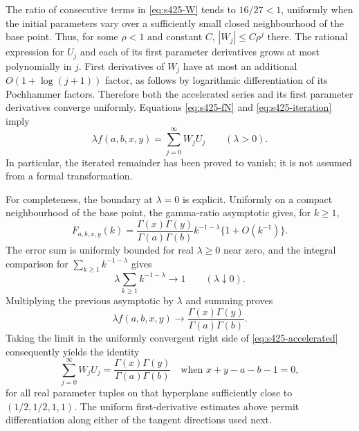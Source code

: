 \documentclass[11pt,a4paper]{article}
\theoremstyle{remark}\newtheorem{remark}[theorem]{Remark}
\numberwithin{equation}{section}
\begin{document}
The ratio of consecutive terms in \eqref{eq:s425-W} tends to
$16/27<1$, uniformly when the initial parameters vary over a sufficiently
small closed neighbourhood of the base point. Thus, for some $\rho<1$
and constant $C$, $|W_j|\le C\rho^j$ there. The rational expression for
$U_j$ and each of its first parameter derivatives grows at most
polynomially in $j$. First derivatives of $W_j$ have at most an
additional $O(1+\log(j+1))$ factor, as follows by logarithmic
differentiation of its Pochhammer factors. Therefore both the accelerated
series and its first parameter derivatives converge uniformly.
Equations \eqref{eq:s425-fN} and \eqref{eq:s425-iteration} imply
\begin{equation}\label{eq:s425-accelerated}
 \lambda f(a,b,x,y)=\sum_{j=0}^{\infty}W_jU_j
 \qquad(\lambda>0).
\end{equation}
In particular, the iterated remainder has been proved to vanish;
it is not assumed from a formal transformation.

For completeness, the boundary at $\lambda=0$ is explicit. Uniformly
on a compact neighbourhood of the base point, the gamma-ratio
asymptotic gives, for $k\ge1$,
\[
 F_{a,b,x,y}(k)=
 \frac{\Gamma(x)\Gamma(y)}{\Gamma(a)\Gamma(b)}
 k^{-1-\lambda}\{1+O(k^{-1})\}.
\]
The error sum is uniformly bounded for real $\lambda\ge0$ near zero,
and the integral comparison for $\sum_{k\ge1}k^{-1-\lambda}$ gives
\[
 \lambda\sum_{k\ge1}k^{-1-\lambda}\longrightarrow1
 \qquad(\lambda\downarrow0).
\]
Multiplying the previous asymptotic by $\lambda$ and summing proves
\[
 \lambda f(a,b,x,y)\longrightarrow
 \frac{\Gamma(x)\Gamma(y)}{\Gamma(a)\Gamma(b)}.
\]
Taking the limit in the uniformly convergent right side of
\eqref{eq:s425-accelerated} consequently yields the identity
\begin{equation}\label{eq:s425-balanced}
 \boxed{\displaystyle
 \sum_{j=0}^{\infty}W_jU_j
 =\frac{\Gamma(x)\Gamma(y)}{\Gamma(a)\Gamma(b)}
 \quad\text{when }x+y-a-b-1=0,}
\end{equation}
for all real parameter tuples on that hyperplane sufficiently close
to $(1/2,1/2,1,1)$. The uniform first-derivative estimates above permit
differentiation along either of the tangent directions used next.
\end{document}
